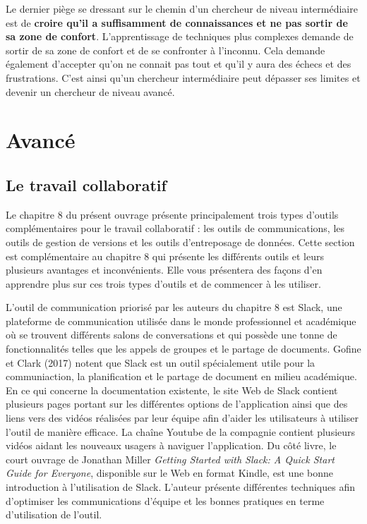 \documentclass[
  letterpaper,
]{scrbook}
\begin{document}
Le dernier piège se dressant sur le chemin d'un chercheur de niveau
intermédiaire est de \textbf{croire qu'il a suffisamment de
connaissances et ne pas sortir de sa zone de confort}. L'apprentissage
de techniques plus complexes demande de sortir de sa zone de confort et
de se confronter à l'inconnu. Cela demande également d'accepter qu'on ne
connait pas tout et qu'il y aura des échecs et des frustrations. C'est
ainsi qu'un chercheur intermédiaire peut dépasser ses limites et devenir
un chercheur de niveau avancé.

\hypertarget{avancuxe9}{%
\section{Avancé}\label{avancuxe9}}

\hypertarget{le-travail-collaboratif}{%
\subsection{Le travail collaboratif}\label{le-travail-collaboratif}}

Le chapitre 8 du présent ouvrage présente principalement trois types
d'outils complémentaires pour le travail collaboratif : les outils de
communications, les outils de gestion de versions et les outils
d'entreposage de données. Cette section est complémentaire au chapitre 8
qui présente les différents outils et leurs plusieurs avantages et
inconvénients. Elle vous présentera des façons d'en apprendre plus sur
ces trois types d'outils et de commencer à les utiliser.

L'outil de communication priorisé par les auteurs du chapitre 8 est
Slack, une plateforme de communication utilisée dans le monde
professionnel et académique où se trouvent différents salons de
conversations et qui possède une tonne de fonctionnalités telles que les
appels de groupes et le partage de documents. Gofine et Clark (2017)
notent que Slack est un outil spécialement utile pour la communiaction,
la planification et le partage de document en milieu académique. En ce
qui concerne la documentation existente, le site Web de Slack contient
plusieurs pages portant sur les différentes options de l'application
ainsi que des liens vers des vidéos réalisées par leur équipe afin
d'aider les utilisateurs à utiliser l'outil de manière efficace. La
chaîne Youtube de la compagnie contient plusieurs vidéos aidant les
nouveaux usagers à naviguer l'application. Du côté livre, le court
ouvrage de Jonathan Miller \emph{Getting Started with Slack: A Quick
Start Guide for Everyone}, disponible sur le Web en format Kindle, est
une bonne introduction à l'utilisation de Slack. L'auteur présente
différentes techniques afin d'optimiser les communications d'équipe et
les bonnes pratiques en terme d'utilisation de l'outil.
\end{document}
